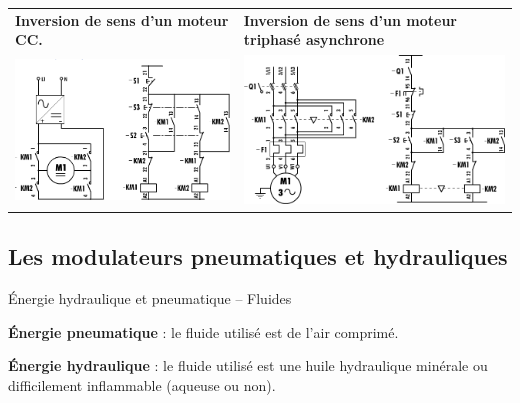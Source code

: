 \begin{tabular}{p{.47\linewidth}p{.47\linewidth}}
\textbf{Inversion de sens d'un moteur CC.} & \textbf{Inversion de sens
d'un moteur triphasé asynchrone} \\
\includegraphics[width=.9\linewidth]{media/image109.png} &
\includegraphics[width=.9\linewidth]{media/image110.png} \\
\end{tabular}

\subsection{Les modulateurs pneumatiques et hydrauliques}

\begin{defi}{Énergie hydraulique et pneumatique -- Fluides}

\textbf{Énergie pneumatique} : le fluide utilisé est de l'air comprimé.

\textbf{Énergie hydraulique} : le fluide utilisé est une huile
hydraulique minérale ou difficilement inflammable (aqueuse ou non). \\

\end{defi}


